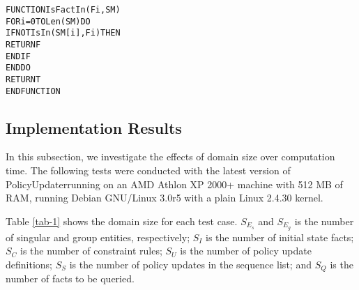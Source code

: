 \documentclass[global,twocolumn,final]{svjour}
\newenvironment{vverbatim}
  {\begin{alltt}}
  {\vspace{-\baselineskip}\end{alltt}}
\begin{document}
        \begin{vverbatim}
FUNCTION IsFactIn(Fi, SM)
  FOR i = 0 TO Len(SM) DO
    IF NOT IsIn(SM[i], Fi) THEN
      RETURN F
    ENDIF
  ENDDO
  RETURN T
ENDFUNCTION
        \end{vverbatim}

    \subsection{Implementation Results}

      In this subsection, we investigate the effects of domain size over
      computation time. The following tests were conducted with the latest
      version of PolicyUpdater\footnotemark running on an AMD Athlon
      XP 2000+ machine with 512 MB of RAM, running Debian GNU/Linux 3.0r5
      with a plain Linux 2.4.30 kernel.


      Table \ref{tab-1} shows the domain size for each test case. $S_{E_{s}}$
      and $S_{E_{g}}$ is the number of singular and group entities,
      respectively; $S_{I}$ is the number of initial state facts; $S_{C}$ is
      the number of constraint rules; $S_{U}$ is the number of policy update
      definitions; $S_{S}$ is the number of policy updates in the sequence
      list; and $S_{Q}$ is the number of facts to be queried.
\end{document}
